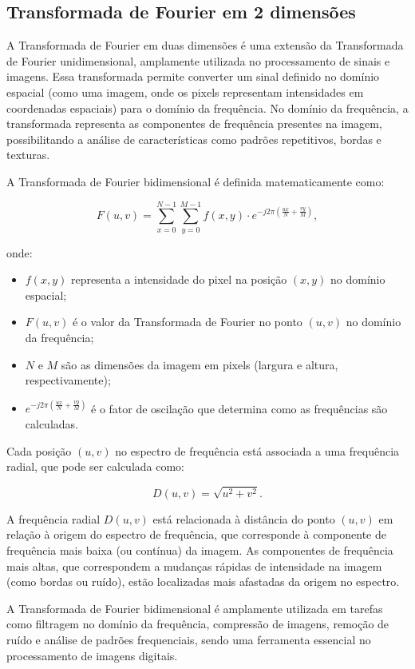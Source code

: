 \subsection{Transformada de Fourier em 2 dimensões}

A Transformada de Fourier em duas dimensões é uma extensão da Transformada de Fourier unidimensional, amplamente utilizada no processamento de sinais e imagens. Essa transformada permite converter um sinal definido no domínio espacial (como uma imagem, onde os pixels representam intensidades em coordenadas espaciais) para o domínio da frequência. No domínio da frequência, a transformada representa as componentes de frequência presentes na imagem, possibilitando a análise de características como padrões repetitivos, bordas e texturas.

A Transformada de Fourier bidimensional é definida matematicamente como:

$$
    F(u,v) = \sum_{x=0}^{N-1} \sum_{y=0}^{M-1} f(x,y) \cdot e^{-j 2\pi \left(\frac{ux}{N} + \frac{vy}{M}\right)},
$$

onde:
\begin{itemize}
    \item $f(x, y)$ representa a intensidade do pixel na posição $(x, y)$ no domínio espacial;
    \item $F(u, v)$ é o valor da Transformada de Fourier no ponto $(u, v)$ no domínio da frequência;
    \item $N$ e $M$ são as dimensões da imagem em pixels (largura e altura, respectivamente);
    \item $e^{-j 2\pi (\frac{ux}{N} + \frac{vy}{M})}$ é o fator de oscilação que determina como as frequências são calculadas.
\end{itemize}

Cada posição $(u, v)$ no espectro de frequência está associada a uma frequência radial, que pode ser calculada como:

$$
    D(u, v) = \sqrt{u^2 + v^2}.
$$

A frequência radial $D(u, v)$ está relacionada à distância do ponto $(u, v)$ em relação à origem do espectro de frequência, que corresponde à componente de frequência mais baixa (ou contínua) da imagem. As componentes de frequência mais altas, que correspondem a mudanças rápidas de intensidade na imagem (como bordas ou ruído), estão localizadas mais afastadas da origem no espectro.

A Transformada de Fourier bidimensional é amplamente utilizada em tarefas como filtragem no domínio da frequência, compressão de imagens, remoção de ruído e análise de padrões frequenciais, sendo uma ferramenta essencial no processamento de imagens digitais.

